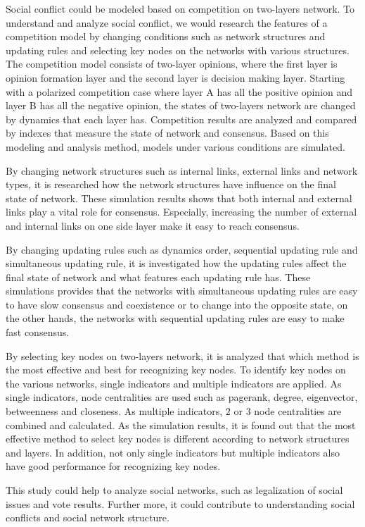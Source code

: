 

\begin{englishabstract}
Social conflict could be modeled based on competition on two-layers network. To understand and analyze social conflict, we would research the features of a competition model by changing conditions such as network structures and updating rules and selecting key nodes on the networks with various structures. The competition model consists of two-layer opinions, where the first layer is opinion formation layer and the second layer is decision making layer. Starting with a polarized competition case where layer A has all the positive opinion and layer B has all the negative opinion, the states of two-layers network are changed by dynamics that each layer has. Competition results are analyzed and compared by indexes that measure the state of network and consensus. Based on this modeling and analysis method, models under various conditions are simulated.  

By changing network structures such as internal links, external links and network types, it is researched how the network structures have influence on the final state of network. These simulation results shows that both internal and external links play a vital role for consensus. Especially, increasing the number of external and internal links on one side layer make it easy to reach consensus.

By changing updating rules such as dynamics order, sequential updating rule and simultaneous updating rule, it is investigated how the updating rules affect the final state of network and what features each updating rule has. These simulations provides that the networks with simultaneous updating rules are easy to have slow consensus and coexistence or to change into the opposite state, on the other hands, the networks with sequential updating rules are easy to make fast consensus.

By selecting key nodes on two-layers network, it is analyzed that which method is the most effective and best for recognizing key nodes. To identify key nodes on the various networks, single indicators and multiple indicators are applied. As single indicators, node centralities are used such as pagerank, degree, eigenvector, betweenness and closeness. As multiple indicators, $2$ or $3$ node centralities are combined and calculated. As the simulation results, it is found out that the most effective method to select key nodes is different according to network structures and layers. In addition, not only single indicators but multiple indicators also have good performance for recognizing key nodes.

This study could help to analyze social networks, such as legalization of social issues and vote results. Further more, it could contribute to understanding social conflicts and social network structure.\\ \\

\end{englishabstract}

